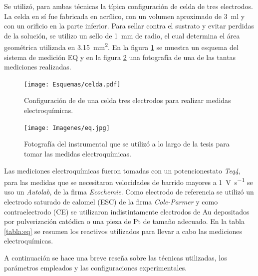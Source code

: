 			Se utilizó, para ambas técnicas la típica configuración de celda de tres electrodos. La celda en sí fue fabricada en acrílico, con un volumen aproximado de \SI{3}{\ml} y con un orificio en la parte inferior. Para sellar contra el sustrato y evitar perdidas de la solución, se utilizo un sello de \SI{1}{\mm} de radio, el cual determina el área geométrica utilizada en \SI{3.15}{\mm^{2}}. En la figura \ref{fig:celda} se muestra un esquema del sistema de medición EQ y en la figura \ref{esq:eq} una fotografía de una de las tantas mediciones realizadas. 

			 \begin{figure}[!ht]
			 		  \begin{center}
			 		  \texttt{[image: Esquemas/celda.pdf]}
			 		  \caption[Configuración de una celda de tres electrodos]{Configuración de de una celda tres electrodos para realizar medidas electroquímicas.}
			 		  \label{fig:celda}
			 		  \end{center}
			 		  \end{figure}

	 		 \begin{figure}[ht!]
			 		  \begin{center}
			 		  \texttt{[image: Imagenes/eq.jpg]}
			 		  \caption[Equipo para realizar la medidas electroquímicas]{Fotografía del instrumental que se utilizó a lo largo de la tesis para tomar las medidas electroquímicas.}
			 		  \label{esq:eq}
			 		  \end{center}
			 		  \end{figure}	
			 		  
			Las mediciones electroquímicas fueron tomadas con un potencionestato \textit{Teq4}, para las medidas que se necesitaron velocidades de barrido mayores a \SI{1}{\volt\per\second} se uso un \textit{Autolab}, de la firma \textit{Ecochemie}. Como electrodo de referencia se utilizó un electrodo saturado de calomel (ESC) de la firma \textit{Cole-Parmer} y como contraelectrodo (CE) se utilizaron indistintamente electrodos de Au depositados por pulverización catódica o una pieza de Pt de tamaño adecuado. En la tabla \ref{tabla:eq} se resumen los reactivos utilizados para llevar a cabo las mediciones electroquímicas. 
			
			A continuación se hace una breve reseña sobre las técnicas utilizadas, los parámetros empleados y las configuraciones experimentales.

			 \pagebreak

